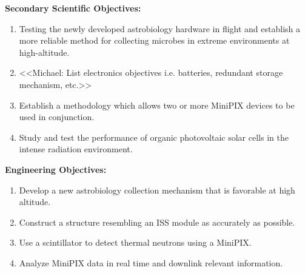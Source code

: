 \noindent \textbf {Secondary Scientific Objectives:}
\begin{enumerate}
\item Testing the newly developed astrobiology hardware in flight and establish a more reliable method for collecting microbes in extreme environments at high-altitude.
\item <<Michael: List electronics objectives i.e. batteries, redundant storage mechanism, etc.>>
\item Establish a methodology which allows two or more MiniPIX devices to be used in conjunction.
\item Study and test the performance of organic photovoltaic solar cells in the intense radiation environment.
\end{enumerate}

\noindent \textbf {Engineering Objectives:}
\begin{enumerate}
\item Develop a new astrobiology collection mechanism that is favorable at high altitude.
\item Construct a structure resembling an ISS module as accurately as possible.
\item Use a scintillator to detect thermal neutrons using a MiniPIX.
\item Analyze MiniPIX data in real time and downlink relevant information.
\end{enumerate}


